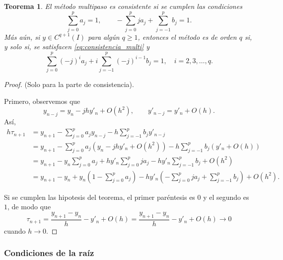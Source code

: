 \documentclass[11pt,letterpaper]{report}
\newtheorem{theorem}{Teorema}
\begin{document}
\begin{theorem}
  El método multipaso es consistente si se cumplen las condiciones
  \begin{equation}\label{eq:consistencia_multi}
    \sum_{j=0}^{p}a_j = 1,
    \qquad
    -\sum_{j=0}^{p}ja_j + \sum_{j=-1}^{p}b_j = 1.
  \end{equation}
  Más aún, si $y\in C^{q+1}(I)$ para algún $q\geq 1$, entonces el
  método es de orden $q$ si, y solo si, se satisfacen
  \eqref{eq:consistencia_multi} y
  \begin{equation}
    \sum_{j=0}^{p}(-j)^{i}a_j + i \sum_{j=-1}^{p}(-j)^{i-1}b_j = 1,
    \quad i=2,3,\dots,q
  .\end{equation}
\end{theorem}
\begin{proof}
  (Solo para la parte de consistencia).

  Primero, observemos que
  \begin{equation}
    y_{n-j} = y_{n} - jhy'_n + O(h^{2}),
    \qquad 
    y'_{n-j} = y'_n + O(h)
  .\end{equation}
  Así,
  \begin{align}
    h\tau_{n+1}
    &= y_{n+1}
    - \sum_{j=0}^{p}a_jy_{n-j}
    - h \sum_{j=-1}^{p}b_{j}y'_{n-j} \\
    &= y_{n+1}
    - \sum_{j=0}^{p}a_j(y_n - jhy'_n + O(h^{2}))
    - h \sum_{j=-1}^{p}b_{j}(y'_{n}+O(h)) \\
    &= y_{n+1}
    - y_n \sum_{j=0}^{p}a_j
    + hy'_n \sum_{j=0}^{p}ja_j
    - hy'_n \sum_{j=-1}^{p}b_{j} + O(h^{2})
    \\
    &= y_{n+1} - y_n
    + y_n\left(1-\sum_{j=0}^{p}a_j\right)
    - hy'_n
    \left( - \sum_{j=0}^{p}ja_j + \sum_{j=-1}^{p}b_{j} \right)
    + O(h^{2})
  .\end{align}
  
  Si se cumplen las hipotesis del teorema, el primer
  paréntesis es $0$ y el segundo es $1$, de modo que
  \begin{equation}
    \tau_{n+1}
    = \frac{y_{n+1} - y_n}{h} - y'_n + O(h)
    = \frac{y_{n+1} - y_n}{h} - y'_n + O(h)
    \to 0
  \end{equation}
  cuando $h\to 0$.
\end{proof}

\subsubsection{Condiciones de la raíz}
\end{document}
